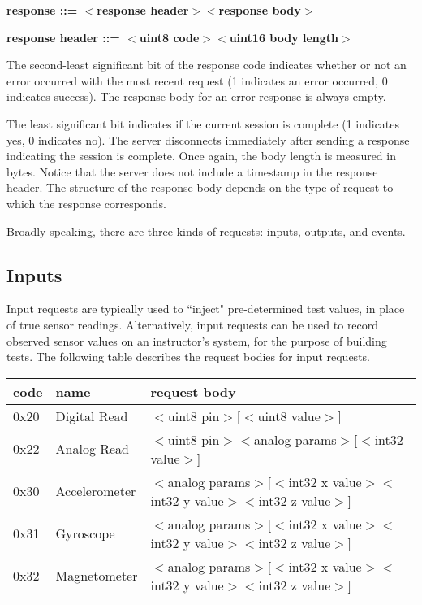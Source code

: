 \documentclass[12pt]{article}
\begin{document}
\textbf{response ::= $<$response header$>$$<$response body$>$}

\textbf{response header ::= $<$uint8 code$>$$<$uint16 body length$>$}

\noindent The second-least significant bit of the response code indicates whether or not an error occurred with the most recent request (1 indicates an error occurred, 0 indicates success).  The response body for an error response is always empty.

The least significant bit indicates if the current session is complete (1 indicates yes, 0 indicates no).  The server disconnects immediately after sending a response indicating the session is complete.  Once again, the body length is measured in bytes.  Notice that the server does not include a timestamp in the response header.  The structure of the response body depends on the type of request to which the response corresponds.

Broadly speaking, there are three kinds of requests: inputs, outputs, and events.

\subsection{Inputs}
Input requests are typically used to ``inject" pre-determined test values, in place of true sensor readings.  Alternatively, input requests can be used to record observed sensor values on an instructor's system, for the purpose of building tests.  The following table describes the request bodies for input requests.

\begin{center}
\begin{tabular}{l l l}
code & name & request body \\ \hline
0x20 & Digital Read & $<$uint8 pin$>$[$<$uint8 value$>$] \\
0x22 & Analog Read & $<$uint8 pin$>$$<$analog params$>$[$<$int32 value$>$] \\
0x30 & Accelerometer & $<$analog params$>$[$<$int32 x value$>$$<$int32 y value$>$$<$int32 z value$>$] \\
0x31 & Gyroscope & $<$analog params$>$[$<$int32 x value$>$$<$int32 y value$>$$<$int32 z value$>$] \\
0x32 & Magnetometer & $<$analog params$>$[$<$int32 x value$>$$<$int32 y value$>$$<$int32 z value$>$] \\ \hline
\end{tabular}
\end{center}
\end{document}
